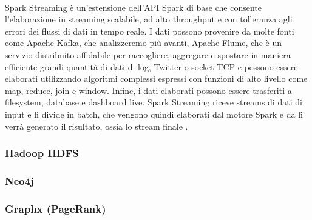 \\Spark Streaming è un'estensione dell'API Spark di base che consente l'elaborazione in streaming scalabile, ad alto throughput e con tolleranza agli errori dei flussi di dati in tempo reale. I dati possono provenire da molte fonti come Apache Kafka, che analizzeremo più avanti, Apache Flume, che è un servizio distribuito affidabile per raccogliere, aggregare e spostare in maniera efficiente grandi quantità di dati di log, Twitter o socket TCP e possono essere elaborati utilizzando algoritmi complessi espressi con funzioni di alto livello come map, reduce, join e window. Infine, i dati elaborati possono essere trasferiti a filesystem, database e dashboard live. Spark Streaming riceve streams di dati di input e li divide in batch, che vengono quindi elaborati dal motore Spark e da lì verrà generato il risultato, ossia lo stream finale \cite{spark:home}.

\subsubsection{Hadoop HDFS}
\label{sec:hadoop HDFS}

\subsubsection{Neo4j}
\label{sec:neo4j}

\subsubsection{Graphx (PageRank)}
\label{sec:graphx (PageRank)}
